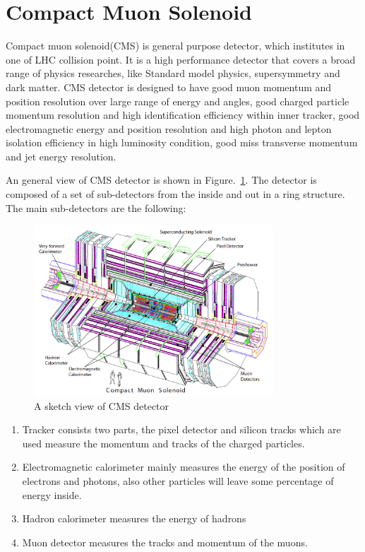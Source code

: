 \section{Compact Muon Solenoid}
Compact muon solenoid(CMS) is general purpose detector, which institutes in one of LHC collision point. It is a high performance detector that covers a broad range of physics researches, like Standard model physics, supersymmetry and dark matter. CMS detector is designed to have good muon momentum and position resolution over large range of energy and angles, good charged particle momentum resolution and high identification efficiency within inner tracker, good electromagnetic energy and position resolution and high photon and lepton isolation efficiency in high luminosity condition, good miss transverse momentum and jet energy resolution.  


An general view of CMS detector is shown in Figure.~\ref{fig:CMS_sketch}. The detector is composed of a set of sub-detectors from the inside and out in a ring structure. The main sub-detectors are the following:

\begin{figure}[htbp] 
\centering
\includegraphics[width=0.8\textwidth]{chapter3/CMS_detecter.png}
\caption{A sketch view of CMS detector~\cite{CMS_experiment}}
\label{fig:CMS_sketch}
\end{figure}


\begin{enumerate}[$\bullet$]
\item Tracker consists two parts, the pixel detector and silicon tracks which are used measure the momentum and tracks of the charged particles.
\item Electromagnetic calorimeter mainly measures the energy of the position of electrons and photons, also other particles will leave some percentage of energy inside. 
\item Hadron calorimeter measures the energy of hadrons 
\item Muon detector measures the tracks and momentum of the muons.
\end{enumerate} 

